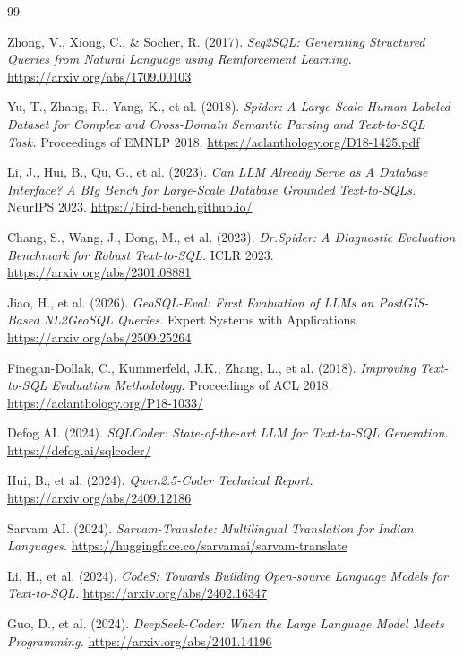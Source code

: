 \documentclass[11pt,a4paper]{article}
\begin{document}
\newpage
\begin{thebibliography}{99}

Zhong, V., Xiong, C., \& Socher, R. (2017).
\textit{Seq2SQL: Generating Structured Queries from Natural Language using Reinforcement Learning.}
\url{https://arxiv.org/abs/1709.00103}

Yu, T., Zhang, R., Yang, K., et al. (2018).
\textit{Spider: A Large-Scale Human-Labeled Dataset for Complex and Cross-Domain Semantic Parsing and Text-to-SQL Task.}
Proceedings of EMNLP 2018.
\url{https://aclanthology.org/D18-1425.pdf}

Li, J., Hui, B., Qu, G., et al. (2023).
\textit{Can LLM Already Serve as A Database Interface? A BIg Bench for Large-Scale Database Grounded Text-to-SQLs.}
NeurIPS 2023.
\url{https://bird-bench.github.io/}

Chang, S., Wang, J., Dong, M., et al. (2023).
\textit{Dr.Spider: A Diagnostic Evaluation Benchmark for Robust Text-to-SQL.}
ICLR 2023.
\url{https://arxiv.org/abs/2301.08881}

Jiao, H., et al. (2026).
\textit{GeoSQL-Eval: First Evaluation of LLMs on PostGIS-Based NL2GeoSQL Queries.}
Expert Systems with Applications.
\url{https://arxiv.org/abs/2509.25264}

Finegan-Dollak, C., Kummerfeld, J.K., Zhang, L., et al. (2018).
\textit{Improving Text-to-SQL Evaluation Methodology.}
Proceedings of ACL 2018.
\url{https://aclanthology.org/P18-1033/}

Defog AI. (2024).
\textit{SQLCoder: State-of-the-art LLM for Text-to-SQL Generation.}
\url{https://defog.ai/sqlcoder/}

Hui, B., et al. (2024).
\textit{Qwen2.5-Coder Technical Report.}
\url{https://arxiv.org/abs/2409.12186}

Sarvam AI. (2024).
\textit{Sarvam-Translate: Multilingual Translation for Indian Languages.}
\url{https://huggingface.co/sarvamai/sarvam-translate}

Li, H., et al. (2024).
\textit{CodeS: Towards Building Open-source Language Models for Text-to-SQL.}
\url{https://arxiv.org/abs/2402.16347}

Guo, D., et al. (2024).
\textit{DeepSeek-Coder: When the Large Language Model Meets Programming.}
\url{https://arxiv.org/abs/2401.14196}


\end{thebibliography}
\end{document}
